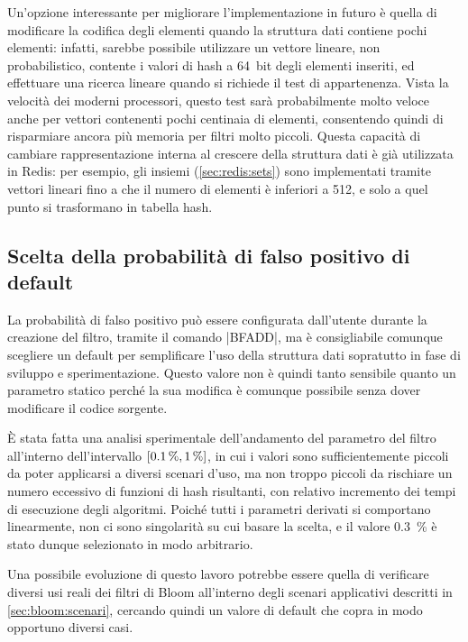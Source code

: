 Un'opzione interessante per migliorare l'implementazione in futuro è quella di modificare la
codifica degli elementi quando la struttura dati contiene pochi elementi: infatti, sarebbe possibile
utilizzare un vettore lineare, non probabilistico, contente i valori di hash a \SI{64}{bit} degli
elementi inseriti, ed effettuare una ricerca lineare quando si richiede il test di appartenenza.
Vista la velocità dei moderni processori, questo test sarà probabilmente molto veloce anche per
vettori contenenti pochi centinaia di elementi, consentendo quindi di risparmiare ancora più memoria
per filtri molto piccoli. Questa capacità di cambiare rappresentazione interna al crescere della
struttura dati è già utilizzata in Redis: per esempio, gli insiemi (\autoref{sec:redis:sets})
sono implementati tramite vettori lineari fino a che il numero di elementi è inferiori a 512, e
solo a quel punto si trasformano in tabella hash.

\subsection{Scelta della probabilità di falso positivo di default}
\label{sec:patch:defaulterror}

La probabilità di falso positivo può essere configurata dall'utente durante la creazione del
filtro, tramite il comando \cverb|BFADD|, ma è consigliabile comunque scegliere un default per
semplificare l'uso della struttura dati sopratutto in fase di sviluppo e sperimentazione. Questo
valore non è quindi tanto sensibile quanto un parametro statico perché la sua modifica è comunque
possibile senza dover modificare il codice sorgente.

È stata fatta una analisi sperimentale dell'andamento del parametro del filtro all'interno
dell'intervallo $\interval{\SI{0.1}{\%}}{\SI{1}{\%}}$, in cui i valori sono sufficientemente piccoli
da poter applicarsi a diversi scenari d'uso, ma non troppo piccoli da rischiare un numero eccessivo
di funzioni di hash risultanti, con relativo incremento dei tempi di esecuzione degli algoritmi.
Poiché tutti i parametri derivati si comportano linearmente, non ci sono singolarità su cui basare
la scelta, e il valore \SI{0.3}{\%} è stato dunque selezionato in modo arbitrario.

Una possibile evoluzione di questo lavoro potrebbe essere quella di verificare diversi usi reali
dei filtri di Bloom all'interno degli scenari applicativi descritti in \autoref{sec:bloom:scenari}, 
cercando quindi un valore di default che copra in modo opportuno diversi casi.

